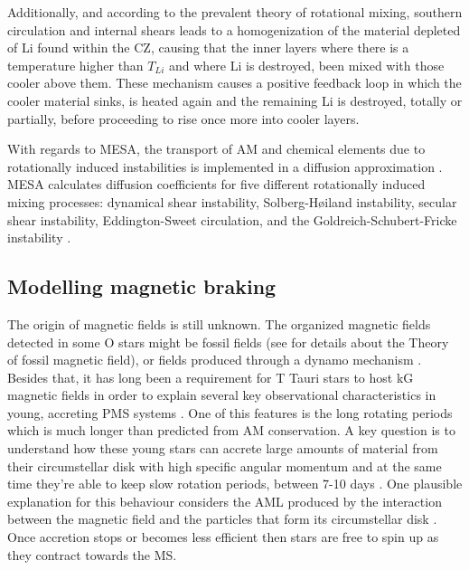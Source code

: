 \documentclass[fleqn,usenatbib]{mnras}
\begin{document}
Additionally, and according to the prevalent theory of rotational mixing, southern circulation and internal shears leads to a homogenization of the material depleted of Li found within the CZ, causing that the inner layers where there is a temperature higher than $T_{Li}$ and where Li is destroyed, been mixed with those cooler above them. These mechanism causes a positive feedback loop in which the cooler material sinks, is heated again and the remaining Li is destroyed, totally or partially, before proceeding to rise once more into cooler layers. \par

With regards to MESA, the transport of AM and chemical elements due to rotationally induced instabilities is implemented in a diffusion approximation \citet{Endal1978}. MESA calculates diffusion coefficients for five different rotationally induced mixing processes: dynamical shear instability, Solberg-H{\o}iland instability, secular shear instability, Eddington-Sweet circulation, and the Goldreich-Schubert-Fricke instability \citep{Paxton2013}. 

\subsection{Modelling magnetic braking}
The origin of magnetic fields is still unknown. The organized magnetic fields detected in some O stars \citep{Wade2010} might be fossil fields (see \citet{Dudorov2014} for details about the Theory of fossil magnetic field), or fields produced through a dynamo mechanism \citep{Cantiello2009}. Besides that, it has long been a requirement for T Tauri stars to host kG magnetic fields \citep{Hussain2014} in order to explain several key observational characteristics in young, accreting PMS systems \citep{Johns-Krull2007}. One of this features is the long rotating periods  which is much longer than predicted from AM conservation.  A key question is to understand how these young stars can accrete large amounts of material from their circumstellar disk with high specific angular momentum and at the same time they're able to keep slow rotation periods, between 7-10 days \citep{Hussain2014}. One plausible explanation for this behaviour considers the AML produced by the interaction between the magnetic field and the particles that form its circumstellar disk \citep{Zanni2012}. Once accretion stops or becomes less efficient then stars are free to spin up as they contract towards the MS.\par
\end{document}
